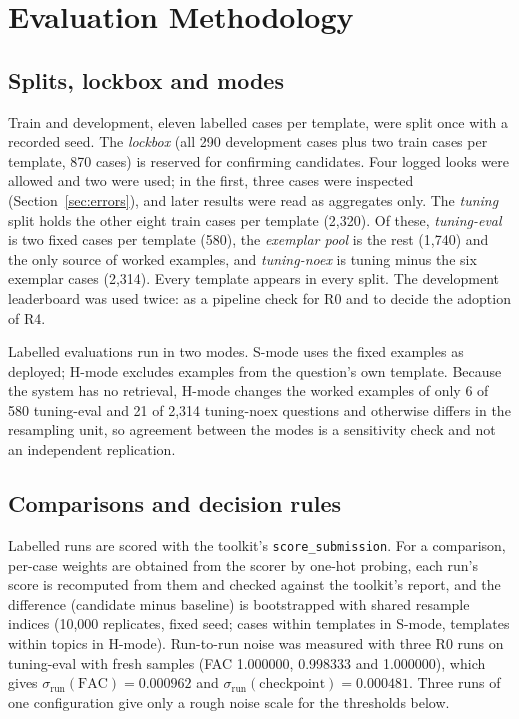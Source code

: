 \documentclass[conference]{IEEEtran}
\newcommand{\id}[1]{\texttt{#1}}
\begin{document}
\section{Evaluation Methodology}\label{sec:method}

\subsection{Splits, lockbox and modes}\label{sec:splits}
Train and development, eleven labelled cases per template, were split once with a recorded seed. The \emph{lockbox} (all 290 development cases plus two train cases per template, 870 cases) is reserved for confirming candidates. Four logged looks were allowed and two were used; in the first, three cases were inspected (Section~\ref{sec:errors}), and later results were read as aggregates only. The \emph{tuning} split holds the other eight train cases per template (2,320). Of these, \emph{tuning-eval} is two fixed cases per template (580), the \emph{exemplar pool} is the rest (1,740) and the only source of worked examples, and \emph{tuning-noex} is tuning minus the six exemplar cases (2,314). Every template appears in every split. The development leaderboard was used twice: as a pipeline check for R0 and to decide the adoption of R4.

Labelled evaluations run in two modes. S-mode uses the fixed examples as deployed; H-mode excludes examples from the question's own template. Because the system has no retrieval, H-mode changes the worked examples of only 6 of 580 tuning-eval and 21 of 2,314 tuning-noex questions and otherwise differs in the resampling unit, so agreement between the modes is a sensitivity check and not an independent replication.

\subsection{Comparisons and decision rules}\label{sec:compare}
Labelled runs are scored with the toolkit's \id{score\_submission}. For a comparison, per-case weights are obtained from the scorer by one-hot probing, each run's score is recomputed from them and checked against the toolkit's report, and the difference (candidate minus baseline) is bootstrapped with shared resample indices (10,000 replicates, fixed seed; cases within templates in S-mode, templates within topics in H-mode). Run-to-run noise was measured with three R0 runs on tuning-eval with fresh samples (FAC 1.000000, 0.998333 and 1.000000), which gives $\sigma_{\mathrm{run}}(\mathrm{FAC})=0.000962$ and $\sigma_{\mathrm{run}}(\mathrm{checkpoint})=0.000481$. Three runs of one configuration give only a rough noise scale for the thresholds below.
\end{document}
